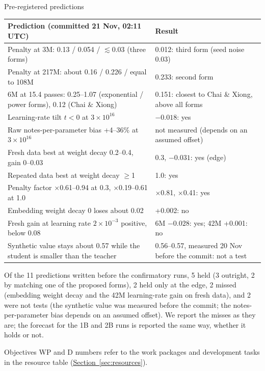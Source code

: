 \documentclass[11pt,a4paper]{article}
\makeatletter
\newcommand{\seclink}[2]{\hyperref[#1]{\textcolor{blue!60!black}{\underline{#2}}}}
\renewcommand\subsection{\@startsection{subsection}{2}{\z@}{-2.6ex \@plus -1ex \@minus -.2ex}{1.2ex \@plus .2ex}%
  {\normalfont\large\bfseries\color{head}}}
\renewcommand\subsubsection{\@startsection{subsubsection}{3}{\z@}{-2.2ex \@plus -.5ex \@minus -.2ex}{0.8ex \@plus .2ex}%
  {\normalfont\normalsize\bfseries\color{head}}}
\makeatother
\begin{document}
\subsubsection{Pre-registered predictions}
\begin{tabularx}{\textwidth}{|X|L{5.2cm}|}
\hline
\textbf{Prediction (committed 21 Nov, 02:11 UTC)} & \textbf{Result}\\ \hline
Penalty at 3M: 0.13 / 0.054 / $\lesssim$0.03 (three forms) & 0.012: third form (seed noise 0.03)\\ \hline
Penalty at 217M: about 0.16 / 0.226 / equal to 108M & 0.233: second form\\ \hline
6M at 15.4 passes: 0.25--1.07 (exponential / power forms), 0.12 (Chai \& Xiong) & 0.151: closest to Chai \& Xiong, above all forms\\ \hline
Learning-rate tilt $t < 0$ at $3\times10^{16}$ & $-0.018$: yes\\ \hline
Raw notes-per-parameter bias +4--36\% at $3\times10^{16}$ & not measured (depends on an assumed offset)\\ \hline
Fresh data best at weight decay 0.2--0.4, gain 0--0.03 & 0.3, $-0.031$: yes (edge)\\ \hline
Repeated data best at weight decay $\geq$1 & 1.0: yes\\ \hline
Penalty factor $\times$0.61--0.94 at 0.3, $\times$0.19--0.61 at 1.0 & $\times$0.81, $\times$0.41: yes\\ \hline
Embedding weight decay 0 loses about 0.02 & +0.002: no\\ \hline
Fresh gain at learning rate $2\times10^{-3}$ positive, below 0.08 & 6M $-0.028$: yes; 42M +0.001: no\\ \hline
Synthetic value stays about 0.57 while the student is smaller than the teacher & 0.56--0.57, measured 20 Nov before the commit: not a test\\
\hline
\end{tabularx}
\vspace{4pt}
Of the 11 predictions written before the confirmatory runs, 5 held (3 outright, 2 by matching one of the proposed
forms), 2 held only at the edge, 2 missed (embedding weight decay and the 42M learning-rate gain on fresh data), and 2
were not tests (the synthetic value was measured before the commit; the notes-per-parameter bias depends on an assumed
offset). We report the misses as they are; the forecast
for the 1B and 2B runs is reported the same way, whether it holds or not.

\subsection{Objectives}\label{sec:objectives}
WP and D numbers refer to the work packages and development tasks in the resource table
(\seclink{sec:resources}{Section~\ref*{sec:resources}}).
\end{document}
